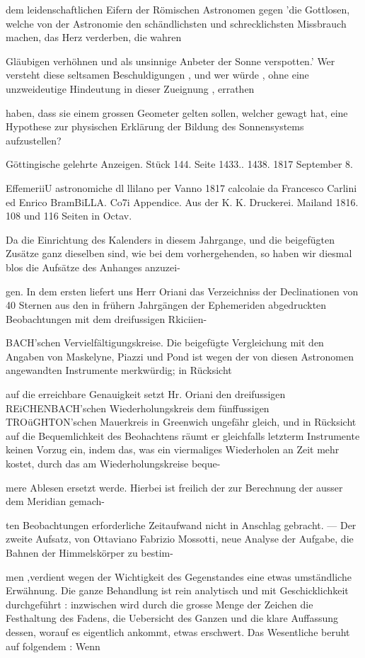 \documentclass[10pt,a4paper]{article}
\begin{document}
dem leidenschaftlichen Eifern der Römischen Astronomen gegen 'die Gottlosen, welche von der Astronomie den schändlichsten und schrecklichsten Missbrauch machen, das Herz verderben, die wahren

Gläubigen verhöhnen und als unsinnige Anbeter der Sonne verspotten.' Wer versteht diese seltsamen Beschuldigungen , und wer würde , ohne eine unzweideutige Hindeutung in dieser Zueignung , errathen

haben, dass sie einem grossen Geometer gelten sollen, welcher gewagt hat, eine Hypothese zur physischen Erklärung der Bildung des Sonnensystems aufzustellen?

Göttingische gelehrte Anzeigen. Stück 144. Seite 1433.. 1438. 1817 September 8.

EffemeriiU astronomiche dl llilano per Vanno 1817 calcolaie da Francesco Carlini ed Enrico BramBiLLA. Co7i Appendice. Aus der K. K. Druckerei. Mailand 1816. 108 und 116 Seiten in Octav.

Da die Einrichtung des Kalenders in diesem Jahrgange, und die beigefügten Zusätze ganz dieselben sind, wie bei dem vorhergehenden, so haben wir diesmal blos die Aufsätze des Anhanges anzuzei-

gen. In dem ersten liefert uns Herr Oriani das Verzeichniss der Declinationen von 40 Sternen aus den in frühern Jahrgängen der Ephemeriden abgedruckten Beobachtungen mit dem dreifussigen Rkiciien-

BACH'schen Vervielfältigungskreise. Die beigefügte Vergleichung mit den Angaben von Maskelyne, Piazzi und Pond ist wegen der von diesen Astronomen angewandten Instrumente merkwürdig; in Rücksicht

auf die erreichbare Genauigkeit setzt Hr. Oriani den dreifussigen REiCHENBACH'schen Wiederholungskreis dem fünffussigen TROüGHTON'schen Mauerkreis in Greenwich ungefähr gleich, und in Rücksicht auf die Bequemlichkeit des Beohachtens räumt er gleichfalls letzterm Instrumente keinen Vorzug ein, indem das, was ein viermaliges Wiederholen an Zeit mehr kostet, durch das am Wiederholungskreise beque-

mere Ablesen ersetzt werde. Hierbei ist freilich der zur Berechnung der ausser dem Meridian gemach-

ten Beobachtungen erforderliche Zeitaufwand nicht in Anschlag gebracht. — Der zweite Aufsatz, von Ottaviano Fabrizio Mossotti, neue Analyse der Aufgabe, die Bahnen der Himmelskörper zu bestim-

men ,verdient wegen der Wichtigkeit des Gegenstandes eine etwas umständliche Erwähnung. Die ganze Behandlung ist rein analytisch und mit Geschicklichkeit durchgeführt : inzwischen wird durch die grosse Menge der Zeichen die Festhaltung des Fadens, die Uebersicht des Ganzen und die klare Auffassung dessen, worauf es eigentlich ankommt, etwas erschwert. Das Wesentliche beruht auf folgendem : Wenn
\end{document}
